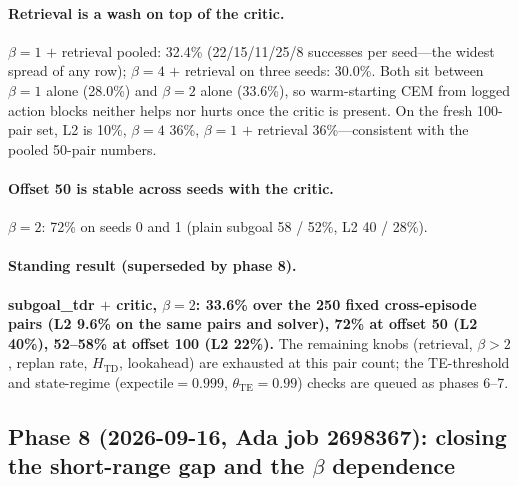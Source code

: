 \documentclass[11pt]{article}
\newcommand{\Htd}{H_{\mathrm{TD}}}
\begin{document}
\paragraph{Retrieval is a wash on top of the critic.} $\beta=1$ $+$ retrieval pooled: 32.4\%
(22/15/11/25/8 successes per seed---the widest spread of any row); $\beta=4$ $+$ retrieval
on three seeds: 30.0\%. Both sit between $\beta=1$ alone (28.0\%) and $\beta=2$ alone
(33.6\%), so warm-starting CEM from logged action blocks neither helps nor hurts once the
critic is present. On the fresh 100-pair set, L2 is 10\%, $\beta=4$ 36\%, $\beta=1$ $+$
retrieval 36\%---consistent with the pooled 50-pair numbers.

\paragraph{Offset 50 is stable across seeds with the critic.} $\beta=2$: 72\% on seeds 0
and 1 (plain subgoal 58 / 52\%, L2 40 / 28\%).

\paragraph{Standing result (superseded by phase 8).} \textbf{subgoal\_tdr $+$ critic, $\beta=2$: 33.6\% over the
250 fixed cross-episode pairs (L2 9.6\% on the same pairs and solver), 72\% at offset 50
(L2 40\%), 52--58\% at offset 100 (L2 22\%).} The remaining knobs (retrieval, $\beta>2$,
replan rate, $\Htd$, lookahead) are exhausted at this pair count; the TE-threshold and
state-regime ($\text{expectile}=0.999$, $\theta_{\mathrm{TE}}=0.99$) checks are queued as
phases 6--7.

\subsection{Phase 8 (2026-09-16, Ada job 2698367): closing the short-range gap and the $\beta$ dependence}
\label{sec:phase8}
\end{document}

